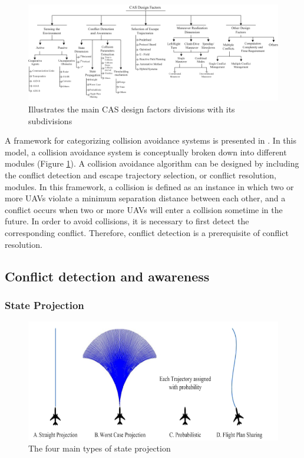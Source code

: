 \documentclass[conference]{IEEEtran}
\begin{document}
\begin{figure}
	\includegraphics [width=1\textwidth] {09Rahim}
	\caption{Illustrates the main CAS design factors divisions with its subdivisions \cite{albaker2009survey}}
	\label{fig:09Rahim}
\end{figure}

A framework for categorizing collision avoidance systems is presented in \cite{albaker2009survey}.  In this model, a collision avoidance system is conceptually broken down into different modules (Figure \ref{fig:09Rahim}).  A collision avoidance algorithm can be designed by including the conflict detection and escape trajectory selection, or conflict resolution, modules.  In this framework, a collision is defined as an instance in which two or more UAVs violate a minimum separation distance between each other, and a conflict occurs when two or more UAVs will enter a collision sometime in the future. In order to avoid collisions, it is necessary to first detect the corresponding conflict.  Therefore, conflict detection is a prerequisite of conflict resolution.

\subsection{Conflict detection and awareness}


\subsubsection{State Projection}

\begin{figure}[h]
	\includegraphics [width=1\columnwidth] {2009RahimProject}
	\caption{The four main types of state projection \cite{albaker2009survey}}
	\label{fig:09RahimProject}
\end{figure}
\end{document}
